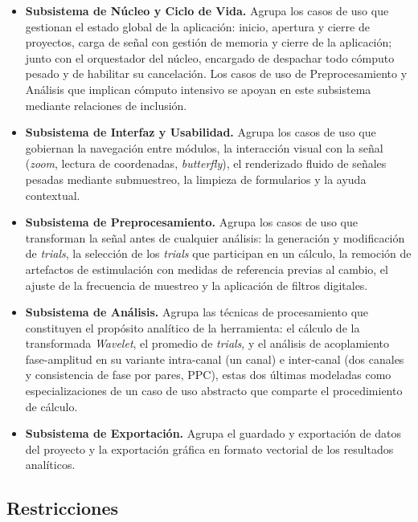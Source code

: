 \documentclass[12pt,letterpaper,oneside]{article}
\begin{document}
\begin{itemize}
    \item \textbf{Subsistema de Núcleo y Ciclo de Vida.} Agrupa los casos de uso que gestionan el estado global de la aplicación: inicio, apertura y cierre de proyectos, carga de señal con gestión de memoria y cierre de la aplicación; junto con el orquestador del núcleo, encargado de despachar todo cómputo pesado y de habilitar su cancelación. Los casos de uso de Preprocesamiento y Análisis que implican cómputo intensivo se apoyan en este subsistema mediante relaciones de inclusión.

    \item \textbf{Subsistema de Interfaz y Usabilidad.} Agrupa los casos de uso que gobiernan la navegación entre módulos, la interacción visual con la señal (\textit{zoom}, lectura de coordenadas, \textit{butterfly}), el renderizado fluido de señales pesadas mediante submuestreo, la limpieza de formularios y la ayuda contextual.

    \item \textbf{Subsistema de Preprocesamiento.} Agrupa los casos de uso que transforman la señal antes de cualquier análisis: la generación y modificación de \textit{trials}, la selección de los \textit{trials} que participan en un cálculo, la remoción de artefactos de estimulación con medidas de referencia previas al cambio, el ajuste de la frecuencia de muestreo y la aplicación de filtros digitales.

    \item \textbf{Subsistema de Análisis.} Agrupa las técnicas de procesamiento que constituyen el propósito analítico de la herramienta: el cálculo de la transformada \textit{Wavelet}, el promedio de \textit{trials}, y el análisis de acoplamiento fase-amplitud en su variante intra-canal (un canal) e inter-canal (dos canales y consistencia de fase por pares, PPC), estas dos últimas modeladas como especializaciones de un caso de uso abstracto que comparte el procedimiento de cálculo.

    \item \textbf{Subsistema de Exportación.} Agrupa el guardado y exportación de datos del proyecto y la exportación gráfica en formato vectorial de los resultados analíticos.
\end{itemize}


\subsection{Restricciones}
\end{document}
